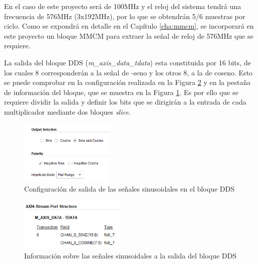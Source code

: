 \vspace{3mm}

En el caso de este proyecto será de 100MHz y el reloj del sistema tendrá una frecuencia de 576MHz (3x192MHz), por lo que se obtendrán 5/6 muestras por ciclo. Como se expondrá en detalle en el Capítulo \ref{cha:mmcm}, se incorporará en este proyecto un bloque MMCM para extraer la señal de reloj de 576MHz que se requiere.

\vspace{3mm}

La salida del bloque DDS (\textit{m\_axis\_data\_tdata}) esta constituida por 16 bits, de los cuales 8 corresponderán a la señal de -seno y los otros 8, a la de coseno. Esto se puede comprobar en la configuración realizada en la Figura \ref{fig:dds_sinu} y en la pestaña de información del bloque, que se muestra en la Figura \ref{fig:dds}. Es por ello que se requiere dividir la salida y definir los bits que se dirigirán a la entrada de cada multiplicador mediante dos bloques \textit{slice}.

\vspace{3mm}

\begin{figure}[h]
    \centering
    \includegraphics[width=0.4\textwidth]{img/diseno/dds_sinu.PNG}
    \caption{Configuración de salida de las señales sinusoidales en el bloque DDS}
    \label{fig:dds}
\end{figure}

\vspace{3mm}

\begin{figure}[h]
    \centering
    \includegraphics[width=0.45\textwidth]{img/diseno/dds.PNG}
    \caption{Información sobre las señales sinusoidales a la salida del bloque DDS}
    \label{fig:dds_sinu}
\end{figure}


